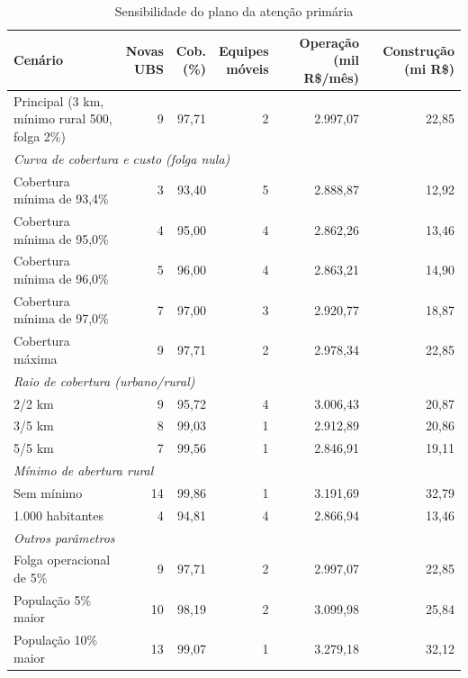 \begin{table}[htbp]\centering\small
\caption{Sensibilidade do plano da atenção primária}\label{tab:sensibilidade}
\begin{tabular}{p{.36\linewidth}rrrrr}
\toprule Cenário & \shortstack{Novas\\UBS} & \shortstack{Cob.\\(\%)} & \shortstack{Equipes\\móveis} & \shortstack{Operação\\(mil R\$/mês)} & \shortstack{Construção\\(mi R\$)}\\\midrule
Principal (3 km, mínimo rural 500, folga 2\%) & 9 & 97,71 & 2 & 2.997,07 & 22,85\\
\midrule
\multicolumn{6}{l}{\textit{Curva de cobertura e custo (folga nula)}}\\
Cobertura mínima de 93,4\% & 3 & 93,40 & 5 & 2.888,87 & 12,92\\
Cobertura mínima de 95,0\% & 4 & 95,00 & 4 & 2.862,26 & 13,46\\
Cobertura mínima de 96,0\% & 5 & 96,00 & 4 & 2.863,21 & 14,90\\
Cobertura mínima de 97,0\% & 7 & 97,00 & 3 & 2.920,77 & 18,87\\
Cobertura máxima & 9 & 97,71 & 2 & 2.978,34 & 22,85\\
\midrule
\multicolumn{6}{l}{\textit{Raio de cobertura (urbano/rural)}}\\
2/2 km & 9 & 95,72 & 4 & 3.006,43 & 20,87\\
3/5 km & 8 & 99,03 & 1 & 2.912,89 & 20,86\\
5/5 km & 7 & 99,56 & 1 & 2.846,91 & 19,11\\
\midrule
\multicolumn{6}{l}{\textit{Mínimo de abertura rural}}\\
Sem mínimo & 14 & 99,86 & 1 & 3.191,69 & 32,79\\
1.000 habitantes & 4 & 94,81 & 4 & 2.866,94 & 13,46\\
\midrule
\multicolumn{6}{l}{\textit{Outros parâmetros}}\\
Folga operacional de 5\% & 9 & 97,71 & 2 & 2.997,07 & 22,85\\
População 5\% maior & 10 & 98,19 & 2 & 3.099,98 & 25,84\\
População 10\% maior & 13 & 99,07 & 1 & 3.279,18 & 32,12\\
\bottomrule\end{tabular}
\end{table}

